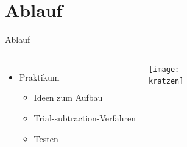 
  \section{Ablauf}
  \begin{frame}{Ablauf}
    \begin{columns}
        \begin{itemize}
          \item Praktikum
          \begin{itemize}
            \item Ideen zum Aufbau
            \item Trial-subtraction-Verfahren
            \item Testen
          \end{itemize}
        \end{itemize}
        \begin{center}
          \texttt{[image: \\kratzen]}
        \end{center}
    \end{columns}
  \end{frame}


